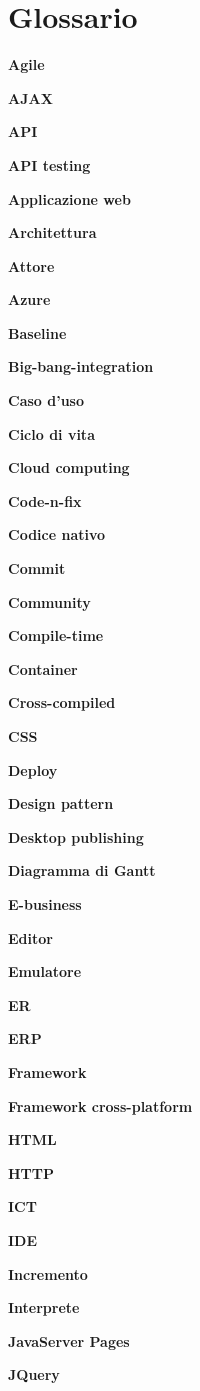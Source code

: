 \chapter{Glossario} \label{gloss}

\textbf{Agile}

\textbf{AJAX}

\textbf{API}

\textbf{API testing}

\textbf{Applicazione web}

\textbf{Architettura}

\textbf{Attore}

\textbf{Azure}

\textbf{Baseline}

\textbf{Big-bang-integration}

\textbf{Caso d'uso}

\textbf{Ciclo di vita}

\textbf{Cloud computing}

\textbf{Code-n-fix}

\textbf{Codice nativo}

\textbf{Commit}

\textbf{Community}

\textbf{Compile-time}

\textbf{Container}

\textbf{Cross-compiled}

\textbf{CSS}

\textbf{Deploy}

\textbf{Design pattern}

\textbf{Desktop publishing}

\textbf{Diagramma di Gantt}

\textbf{E-business}

\textbf{Editor}

\textbf{Emulatore}

\textbf{ER}

\textbf{ERP}

\textbf{Framework}

\textbf{Framework cross-platform}

\textbf{HTML}

\textbf{HTTP}

\textbf{ICT}

\textbf{IDE}

\textbf{Incremento}

\textbf{Interprete}

\textbf{JavaServer Pages}

\textbf{JQuery}

